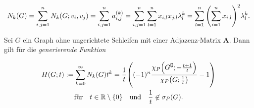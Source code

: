 \begin{remark}
            \begin{align*}
                N_k(G)
                =
                \sum_{i,j=1}^n
                    N_k(G; v_i, v_j)
                =
                \sum_{i,j=1}^n
                    a_{i, j}^{(k)}
                =
                \sum_{i,j=1}^n
                    \sum_{l=1}^n
                    x_{i,l} x_{j,l} \lambda_l^k
                =
                \sum_{l=1}^n
                    {\left ( 
                        \sum_{i=1}^n
                            x_{i,l}
                     \right )}^2
                    \lambda_l^k.
            \end{align*}

        \end{remark}

        \begin{proposition}

            Sei $G$ ein Graph ohne ungerichtete Schleifen mit einer Adjazenz-Matrix $\mathbf A$.
            Dann gilt für die \textit{generierende Funktion}

            \begin{multline*}
                H(G; t)
                :=
                \sum_{k=0}^\infty N_k(G) t^k
                =
                \frac{1}{t}
                {\left ( 
                    (-1)^n
                    \frac
                    {
                        \chi_P
                        {\left ( 
                            G^\complement;
                            -\frac{t+1}{t}
                         \right )}
                    }{
                        \chi_P
                        {\left ( 
                            G;
                            \frac{1}{t}
                         \right )}
                    }
                    -
                    1
                 \right )} \\
                \text{für}
                \quad
                t \in \mathbb R \setminus {\left \{ 0 \right \}}
                \quad
                \text{und}
                \quad
                \frac{1}{t} \not \in \sigma_P(G).
            \end{multline*}

        \end{proposition}

